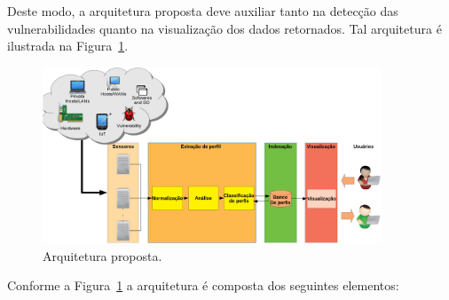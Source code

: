 Deste modo, a arquitetura proposta deve auxiliar tanto na detecção das vulnerabilidades quanto na visualização dos dados retornados. Tal arquitetura é ilustrada na Figura~\ref{fig:projeto:etapas}.
\begin{figure}[H]
    \centering
    \includegraphics[width=0.90\textwidth]{figuras/tcc.png}
    \caption{Arquitetura proposta.}
    \label{fig:projeto:etapas}
\end{figure}
Conforme a Figura~\ref{fig:projeto:etapas} a arquitetura é composta dos seguintes elementos:

